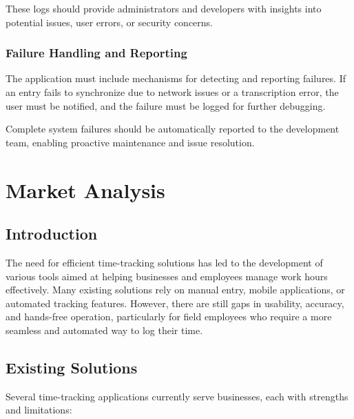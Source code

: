 \documentclass[
  digital,     %
  oneside,     %
  nosansbold,  %
  nocolorbold, %
  lof,         %
  lot,         %
]{fithesis4}
\begin{document}
These logs should provide administrators and developers with insights into potential issues, user errors, or security concerns.

\subsection{Failure Handling and Reporting}  
The application must include mechanisms for detecting and reporting failures. If an entry fails to synchronize due to network issues or a transcription error, the user must be notified, and the failure must be logged for further debugging.  

Complete system failures should be automatically reported to the development team, enabling proactive maintenance and issue resolution.
    
\shorthandoff{-}
\begin{markdown}
   
\end{markdown}
\shorthandon{-}

\chapter{Market Analysis}

\section{Introduction}
The need for efficient time-tracking solutions has led to the development of various tools aimed at helping businesses and employees manage work hours effectively. Many existing solutions rely on manual entry, mobile applications, or automated tracking features. However, there are still gaps in usability, accuracy, and hands-free operation, particularly for field employees who require a more seamless and automated way to log their time.

\section{Existing Solutions}

Several time-tracking applications currently serve businesses, each with strengths and limitations:
\end{document}
